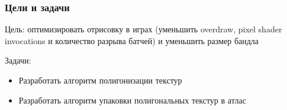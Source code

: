 \documentclass[10pt, unicode]{beamer}
\begin{document}
    \begin{frame}
        \frametitle{Цели и задачи}
        Цель: оптимизировать отрисовку в играх (уменьшить overdraw, pixel shader invocations и количество разрыва батчей) и уменьшить размер бандла

        Задачи:
        \begin{itemize}
            \item Разработать алгоритм полигонизации текстур
            \item Разработать алгоритм упаковки полигональных текстур в атлас
        \end{itemize}
    \end{frame}
\end{document}
